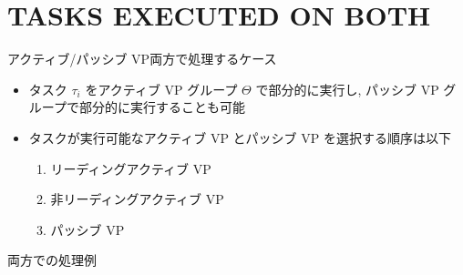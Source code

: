 
\section{TASKS EXECUTED ON BOTH}
\label{sec: tasks executed on both}

\begin{frame}{アクティブ/パッシブ VP両方で処理するケース}
    \begin{itemize}
        \item タスク $\tau_{i}$ をアクティブ VP グループ $\Theta$ で部分的に実行し, パッシブ VP グループで部分的に実行することも可能
        \item タスクが実行可能なアクティブ VP とパッシブ VP を選択する順序は以下
        \begin{enumerate}
            \item リーディングアクティブ VP
            \item 非リーディングアクティブ VP
            \item パッシブ VP
        \end{enumerate}
    \end{itemize}
\end{frame}

\begin{frame}{両方での処理例}
\end{frame}

